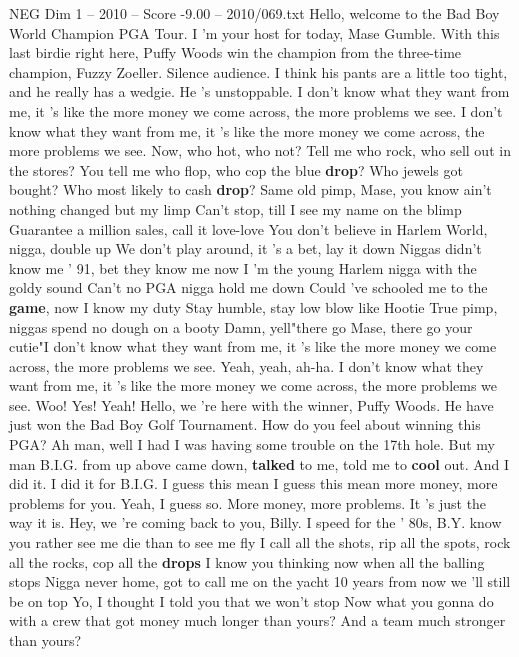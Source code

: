 \begin{textsample}{NEG Dim 1 – 2010 – Score -9.00 – 2010/069.txt}  \label{ex:f1_neg_028}
Hello, welcome to the Bad Boy World Champion PGA Tour.
I 'm your host for today, Mase Gumble.
With this last birdie right here, Puffy Woods win the champion from the three-time champion, Fuzzy Zoeller.
Silence audience.
I think his pants are a little too tight, and he really has a wedgie.
He 's unstoppable.
I don't know what they want from me, it 's like the more money we come across, the more problems we see.
I don't know what they want from me, it 's like the more money we come across, the more problems we see.
Now, who hot, who not?
Tell me who rock, who sell out in the stores?
You tell me who flop, who cop the blue \textbf{drop}?
Who jewels got bought?
Who most likely to cash \textbf{drop}?
Same old pimp, Mase, you know ain't nothing changed but my limp Can't stop, till I see my name on the blimp Guarantee a million sales, call it love-love You don't believe in Harlem World, nigga, double up We don't play around, it 's a bet, lay it down Niggas didn't know me ' 91, bet they know me now I 'm the young Harlem nigga with the goldy sound Can't no PGA nigga hold me down Could 've schooled me to the \textbf{game}, now I know my duty Stay humble, stay low blow like Hootie True pimp, niggas spend no dough on a booty Damn, yell"there go Mase, there go your cutie"I don't know what they want from me, it 's like the more money we come across, the more problems we see.
Yeah, yeah, ah-ha.
I don't know what they want from me, it 's like the more money we come across, the more problems we see.
Woo!
Yes!
Yeah!
Hello, we 're here with the winner, Puffy Woods.
He have just won the Bad Boy Golf Tournament.
How do you feel about winning this PGA?
Ah man, well I had I was having some trouble on the 17th hole.
But my man B.I.G. from up above came down, \textbf{talked} to me, told me to \textbf{cool} out.
And I did it.
I did it for B.I.G.
I guess this mean I guess this mean more money, more problems for you.
Yeah, I guess so.
More money, more problems.
It 's just the way it is.
Hey, we 're coming back to you, Billy.
I speed for the ' 80s, B.Y. know you rather see me die than to see me fly I call all the shots, rip all the spots, rock all the rocks, cop all the \textbf{drops} I know you thinking now when all the balling stops Nigga never home, got to call me on the yacht 10 years from now we 'll still be on top Yo, I thought I told you that we won't stop Now what you gonna do with a crew that got money much longer than yours?
And a team much stronger than yours?

\end{textsample}
